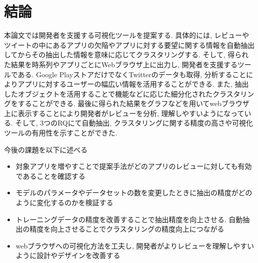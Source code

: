 \chapter{結論}
\label{chap:keturon}

本論文では開発者を支援する可視化ツールを提案する. 具体的には, レビューやツイートの中にあるアプリの欠陥やアプリに対する要望に関する情報を自動抽出してからその抽出した情報を意味に応じてクラスタリングする.  そして, 得られた結果を時系列やアプリごとにWebブラウザ上に出力し, 開発者を支援するツールである.
Google PlayストアだけでなくTwitterのデータも取得, 分析することによりアプリに対するユーザーの幅広い情報を活用することができる. また, 抽出したオブジェクトを活用することで機能などに応じた細分化されたクラスタリングをすることができる. 最後に得られた結果をグラフなどを用いてwebブラウザ上に表示することにより開発者がレビューを分析, 理解しやすいようになっている. 
そして, 3つのRQにて自動抽出, クラスタリングに関する精度の高さや可視化ツールの有用性を示すことができた. 

今後の課題を以下に述べる

\begin{itemize}
    \item 対象アプリを増やすことで提案手法がどのアプリのレビューに対しても有効であることを確認する
    \item モデルのパラメータやデータセットの数を変更したときに抽出の精度がどのように変化するのかを検証する
    \item トレーニングデータの精度を改善することで抽出精度を向上させる. 自動抽出の精度を向上させることでクラスタリングの精度向上につながる
    \item webブラウザへの可視化方法を工夫し, 開発者がよりレビューを理解しやすいように設計やデザインを改善する
\end{itemize}
